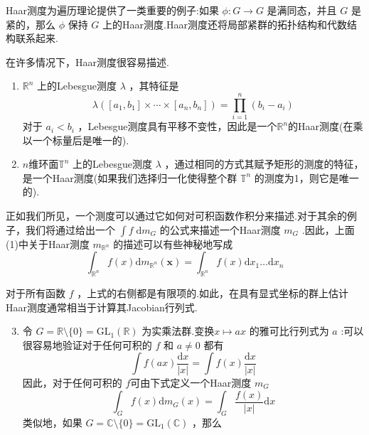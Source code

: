 \documentclass[lang=cn,a4paper,11pt,openany,scheme=chinese]{elegantbook}
\begin{document}
Haar测度为遍历理论提供了一类重要的例子:如果 \(\phi  : G \rightarrow  G\) 是满同态，并且 \(G\) 是紧的，那么 \(\phi\) 保持 \(G\) 上的Haar测度.Haar测度还将局部紧群的拓扑结构和代数结构联系起来.
\setcounter{instance}{4}
\begin{instance}
    在许多情况下，Haar测度很容易描述.\par
    \begin{enumerate}[(1)]
        \item \({\mathbb{R}}^{n}\) 上的Lebesgue测度 \(\lambda\) ，其特征是
    \[
    \lambda \left( {\left\lbrack  {{a}_{1},{b}_{1}}\right\rbrack   \times  \cdots  \times  \left\lbrack  {{a}_{n},{b}_{n}}\right\rbrack  }\right)  = \mathop{\prod }\limits_{{i = 1}}^{n}\left( {{b}_{i} - {a}_{i}}\right)
    \]
    对于 \({a}_{i} < {b}_{i}\) ，Lebesgue测度具有平移不变性，因此是一个\({\mathbb{R}}^{n}\)的Haar测度(在乘以一个标量后是唯一的).
        \item $n$维环面\({\mathbb{T}}^{n}\) 上的Lebesgue测度 \(\lambda\) ，通过相同的方式其赋予矩形的测度的特征，是一个Haar测度(如果我们选择归一化使得整个群 \({\mathbb{T}}^{n}\) 的测度为1，则它是唯一的).
    \end{enumerate}\par
    正如我们所见，一个测度可以通过它如何对可积函数作积分来描述.对于其余的例子，我们将通过给出一个 \(\int f\mathrm{\;d}{m}_{G}\) 的公式来描述一个Haar测度 \({m}_{G}\) .因此，上面(1)中关于Haar测度 \({m}_{{\mathbb{R}}^{n}}\) 的描述可以有些神秘地写成
    \[
    {\int }_{{\mathbb{R}}^{n}}f\left(x\right) \mathrm{d}{m}_{{\mathbb{R}}^{n}}\left( \mathbf{x}\right)  = {\int }_{{\mathbb{R}}^{n}}f\left(x\right) \mathrm{d}{x}_{1}\ldots \mathrm{d}{x}_{n}
    \]\par
    对于所有函数 \(f\) ，上式的右侧都是有限项的.如此，在具有显式坐标的群上估计Haar测度通常相当于计算其Jacobian行列式.
    \begin{enumerate}
        \setcounter{enumi}{2}
        \item 令 \(G = \mathbb{R} \setminus  \{ 0\}  = {\mathrm{{GL}}}_{1}\left( \mathbb{R}\right)\) 为实乘法群.变换\(x \mapsto  {ax}\) 的雅可比行列式为 \(a\) :可以很容易地验证对于任何可积的 \(f\) 和 \(a \neq  0\) 都有
        \[
        \int f\left( {ax}\right) \frac{\mathrm{d}x}{\left| x\right| } = \int f\left( x\right) \frac{\mathrm{d}x}{\left| x\right| }
        \]
        因此，对于任何可积的 \(f\)可由下式定义一个Haar测度 \({m}_{G}\) 
        \[
        {\int }_{G}f\left( x\right) \mathrm{d}{m}_{G}\left( x\right)  = {\int }_{G}\frac{f\left( x\right) }{\left| x\right| }\mathrm{d}x
        \]
        类似地，如果 \(G = \mathbb{C} \setminus  \{ 0\}  = {\mathrm{{GL}}}_{1}\left( \mathbb{C}\right)\) ，那么

\end{enumerate}
\end{instance}
\end{document}
